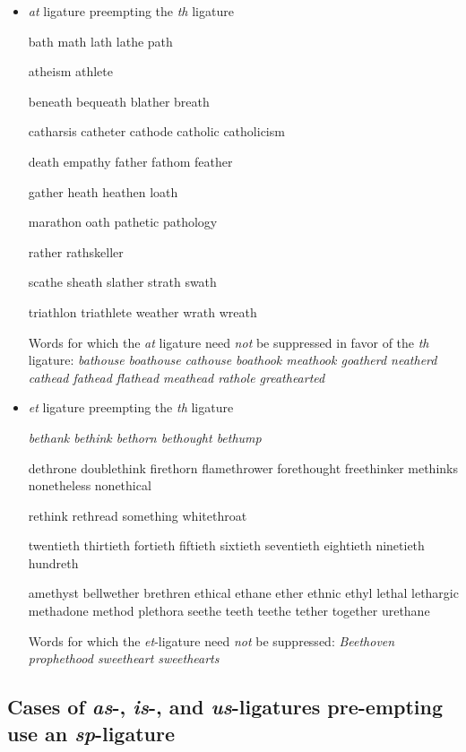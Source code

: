 \begin{itemize}
\item \emph{at} ligature preempting the \emph{th} ligature

\bgroup \em

bath math lath lathe path 

atheism athlete 

beneath bequeath blather breath 

catharsis catheter cathode catholic catholicism

death empathy father fathom feather 

gather heath heathen loath

marathon oath pathetic pathology

rather rathskeller

scathe sheath slather strath swath 

triathlon triathlete weather wrath wreath 


\egroup
\medskip
Words for which the \emph{at} ligature need \emph{not} be suppressed in favor of the \emph{th} ligature:
\emph{bathouse boathouse cathouse boathook meathook goatherd neatherd cathead fathead flathead meathead rathole greathearted}


\item \emph{et} ligature preempting the \emph{th} ligature

\bgroup \em
bethank bethink bethorn bethought bethump 

dethrone doublethink firethorn flamethrower forethought freethinker methinks nonetheless nonethical 

rethink rethread something whitethroat

twentieth thirtieth fortieth fiftieth sixtieth seventieth eightieth ninetieth hundreth 

amethyst bellwether brethren ethical ethane ether ethnic ethyl lethal lethargic methadone method plethora seethe teeth teethe tether together urethane 

\egroup
\medskip
Words for which the \emph{et}-ligature need \emph{not} be suppressed:
\emph{Beethoven prophethood sweetheart sweethearts }

\end{itemize}


\subsection*{Cases of \emph{as}-, \emph{is}-, and \emph{us}-ligatures pre-empting use an \emph{sp}-ligature}

